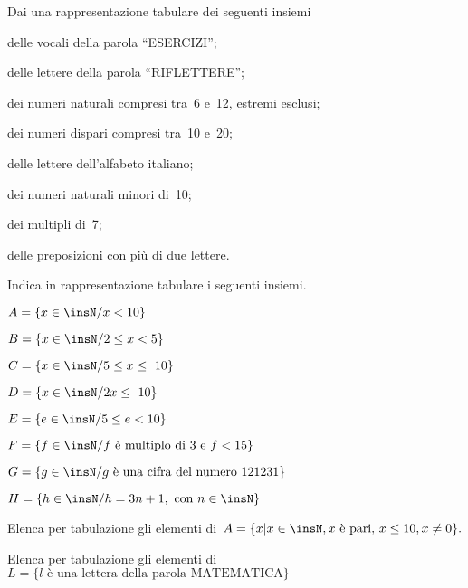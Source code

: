\begin{esercizio}
\label{ese:6.2}
Dai una rappresentazione tabulare dei seguenti insiemi
\begin{enumeratea}
 \item delle vocali della parola ``ESERCIZI'';
 \item delle lettere della parola ``RIFLETTERE'';
 \item dei numeri naturali compresi tra~6 e~12, estremi esclusi;
 \item dei numeri dispari compresi tra~10 e~20;
 \item delle lettere dell'alfabeto italiano;
 \item dei numeri naturali minori di~10;
 \item dei multipli di~7;
 \item delle preposizioni con più di due lettere.
\end{enumeratea}
\end{esercizio}

\begin{esercizio}
 \label{ese:6.3}
Indica in rappresentazione tabulare i seguenti insiemi.
\TabPositions{7.5cm}
\begin{enumeratea}
 \item \(A=\{x\in\insN/x<10\}\)\tab\dotfill
 \item \(B=\{x\in\insN/2\le x<5\}\)\tab\dotfill
 \item \(C=\{x\in\insN/5\le x\le~10\}\)\tab\dotfill
 \item \(D=\{x\in\insN/2x\le~10\}\) \tab\dotfill
 \item \(E=\{e\in\insN/5\le e<10\}\)\tab\dotfill
 \item \(F=\{f\in\insN/f\text{ è multiplo di~3 e } f<15\}\)\tab\dotfill
 \item \(G=\{g\in\insN/g\text{ è una cifra del numero }121231\}\)\tab\dotfill
 \item \(H=\{h\in\insN/h=3n+1,\text{ con }n\in\insN\}\)\tab\dotfill
\end{enumeratea}
\end{esercizio}

\begin{esercizio}
\label{ese:6.4}
Elenca per tabulazione gli elementi di~\(A=\{x|x\in\insN, x\text{ è pari, 
}x\leq10, x\neq0\}.\)
\end{esercizio}

\begin{esercizio}
\label{ese:6.5}
Elenca per tabulazione gli elementi di~\(L=\{l\text{ è una lettera della parola 
MATEMATICA}\}\)
\end{esercizio}

